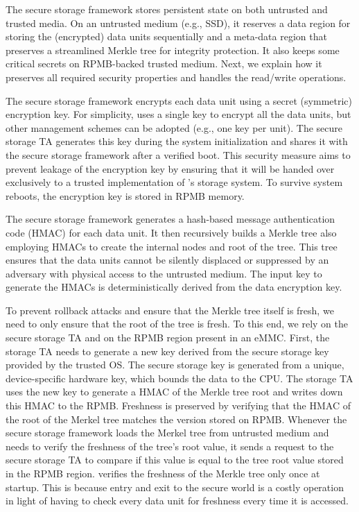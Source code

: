 The secure storage framework stores persistent state on both untrusted and trusted media. On an untrusted medium (e.g., SSD), it reserves a data region for storing the (encrypted) data units sequentially and a meta-data region that preserves a streamlined Merkle tree for integrity protection. It also keeps some critical secrets on RPMB-backed trusted medium. Next, we explain how it preserves all required security properties and handles the read/write operations.

 The secure storage framework encrypts each data unit using a secret (symmetric) encryption key. For simplicity, \project uses a single key to encrypt all the data units, but other management schemes can be adopted (e.g., one key per unit). The secure storage TA generates this key during the system initialization and shares it with the secure storage framework after a verified boot. This security measure aims to prevent leakage of the encryption key by ensuring that it will be handed over exclusively to a trusted implementation of \project's storage system. To survive system reboots, the encryption key is stored in RPMB memory.

 The secure storage framework generates a hash-based message authentication code (HMAC) for each data unit. It then recursively builds a Merkle tree also employing HMACs to create the internal nodes and root of the tree. This tree ensures that the data units cannot be silently displaced or suppressed by an adversary with physical access to the untrusted medium. The input key to generate the HMACs is deterministically derived from the data encryption key.

To prevent rollback attacks and ensure that the Merkle tree itself is fresh, we need to only ensure that the root of the tree is fresh. To this end, we rely on the secure storage TA and on the RPMB region present in an eMMC. First, the storage TA needs to generate a new key derived from the secure storage key provided by the trusted OS. The secure storage key is generated from a unique, device-specific hardware key, which bounds the data to the CPU. The storage TA uses the new key to generate a HMAC of the Merkle tree root and writes down this HMAC to the RPMB. Freshness is preserved by verifying that the HMAC of the root of the Merkel tree matches the version stored on RPMB. Whenever the secure storage framework loads the Merkel tree from untrusted medium and needs to verify the freshness of the tree's root value, it sends a request to the secure storage TA to compare if this value is equal to the tree root value stored in the RPMB region. \project{} verifies the freshness of the Merkle tree only once at startup. This is because entry and exit to the secure world is a costly operation in light of having to check every data unit for freshness every time it is accessed.

